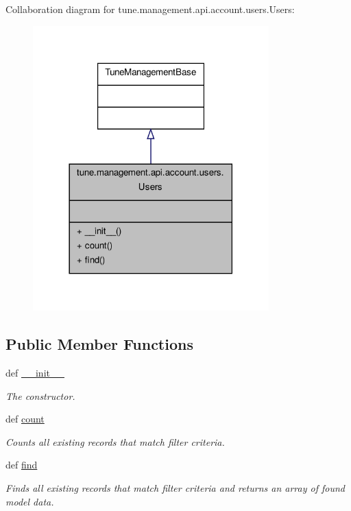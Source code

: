 Collaboration diagram for tune.\-management.\-api.\-account.\-users.\-Users\-:
\nopagebreak
\begin{figure}[H]
\begin{center}
\leavevmode
\includegraphics[width=258pt]{classtune_1_1management_1_1api_1_1account_1_1users_1_1Users__coll__graph}
\end{center}
\end{figure}
\subsection*{Public Member Functions}
\begin{DoxyCompactItemize}
\item 
def \hyperlink{classtune_1_1management_1_1api_1_1account_1_1users_1_1Users_a75c0ccaf0b1024604837f3095a8b70b0}{\-\_\-\-\_\-init\-\_\-\-\_\-}
\begin{DoxyCompactList}\small\item\em The constructor. \end{DoxyCompactList}\item 
def \hyperlink{classtune_1_1management_1_1api_1_1account_1_1users_1_1Users_aab3b1e9346a3e57e9b6f41a597abc521}{count}
\begin{DoxyCompactList}\small\item\em Counts all existing records that match filter criteria. \end{DoxyCompactList}\item 
def \hyperlink{classtune_1_1management_1_1api_1_1account_1_1users_1_1Users_aee5847e22764f22e1cccf55a67e59c89}{find}
\begin{DoxyCompactList}\small\item\em Finds all existing records that match filter criteria and returns an array of found model data. \end{DoxyCompactList}\end{DoxyCompactItemize}


